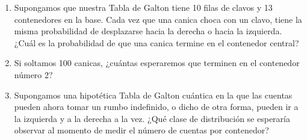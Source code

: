 \documentclass{article}
\begin{document}
\begin{enumerate}
\begin{enumerate}
        \item[b)] Supongamos que nuestra Tabla de Galton tiene 10 filas de clavos y 13 contenedores en la base. Cada vez que una canica choca con un clavo, tiene la misma probabilidad de desplazarse hacia la derecha o hacia la izquierda. ¿Cuál es la probabilidad de que una canica termine en el contenedor central?

        \item[c)] Si soltamos 100 canicas, ¿cuántas esperaremos que terminen en el contenedor número 2?

        \item[d)] Supongamos una hipotética Tabla de Galton cuántica en la que las cuentas pueden ahora tomar un rumbo indefinido, o dicho de otra forma, pueden ir a la izquierda y a la derecha a la vez. ¿Qué clase de distribución se esperaría observar al momento de medir el número de cuentas por contenedor?
    \end{enumerate}
\end{enumerate}
\end{document}
